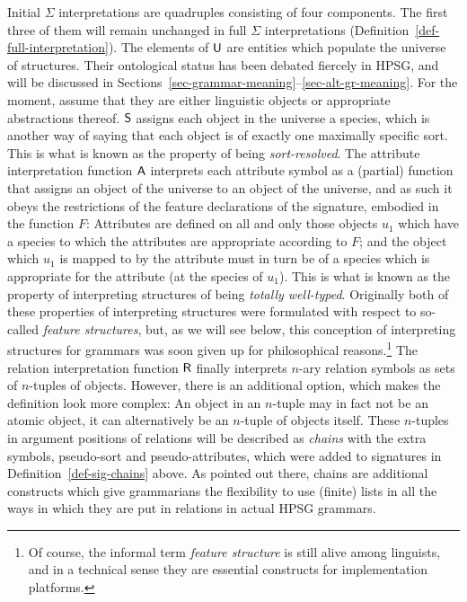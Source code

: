 \documentclass[output=paper
                ,modfonts
                ,nonflat
	        ,collection
	        ,collectionchapter
	        ,collectiontoclongg
 	        ,biblatex
                ,babelshorthands
                ,newtxmath
                ,draftmode
                ,colorlinks, citecolor=brown
]{./langsci/langscibook}
\begin{document}
{{Initial $\Sigma$ interpretations are quadruples consisting of four
components. The first three of them will remain unchanged in full
$\Sigma$ interpretations (Definition~\ref{def-full-interpretation}). The elements of $\mathsf{U}$
are entities which populate the universe of structures. Their ontological
status has been debated fiercely in HPSG, and will be discussed in
Sections~\ref{sec-grammar-meaning}--\ref{sec-alt-gr-meaning}. For the
moment, assume that they are either linguistic objects or appropriate
abstractions thereof. $\mathsf{S}$ assigns each object in the universe
a species, which is another way of saying that each object is of exactly
one maximally specific sort. This is what is known as the property of being
\emph{sort-resolved}. The attribute interpretation function $\mathsf{A}$
interprets each attribute symbol as a (partial) function that assigns an
object of the universe to an object of the universe, and as such it
obeys the restrictions of the feature declarations of the signature,
embodied in the function $F$: Attributes are defined on all and only
those objects $u_1$ which have a species to which the attributes are appropriate
according to $F$; and the object which $u_1$ is mapped to by the attribute
must in turn be of a species which is appropriate for the attribute
(at the species of $u_1$). This is what is known as the property of
interpreting structures of being \emph{totally well-typed}. Originally both
of these properties of interpreting structures were formulated with
respect to so-called \emph{feature structures}, but, as we will see below,
this conception of interpreting structures for grammars
was soon given up for philosophical reasons.\footnote{Of course, the
  informal term \emph{feature structure} is still alive among
  linguists, and in a technical sense they are essential constructs
  for implementation platforms.} The relation interpretation function
$\mathsf{R}$ finally interprets $n$-ary
relation symbols as sets of $n$-tuples of objects. However, there is
an additional option, which makes the definition look more complex: An
object in an $n$-tuple may in fact not be an atomic object, it can
alternatively be an $n$-tuple of objects itself. These $n$-tuples in
argument positions of relations will be described as \emph{chains}
with the extra symbols, pseudo-sort and pseudo-attributes, which were
added to signatures in
Definition~\ref{def-sig-chains} above.  As pointed out there, chains
are additional constructs which give grammarians the flexibility to
use (finite) lists in all the ways in which they are put in relations
in actual HPSG grammars. %

}}
\end{document}
